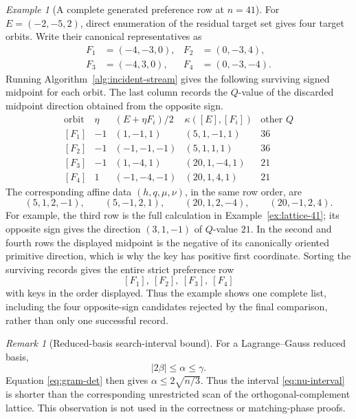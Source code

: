 \documentclass[11pt]{amsart}
\theoremstyle{definition}
\theoremstyle{remark}
\newtheorem{remark}[theorem]{Remark}
\newtheorem{example}[theorem]{Example}
\begin{document}
\begin{example}[A complete generated preference row at $n=41$]
\label{ex:complete-row-41}
For $E=(-2,-5,2)$, direct enumeration of the residual target set gives four
target orbits.  Write their canonical representatives as
\[
\begin{aligned}
 F_1&=(-4,-3,0),&F_2&=(0,-3,4),\\
 F_3&=(-4,3,0), &F_4&=(0,-3,-4).
\end{aligned}
\]
Running Algorithm~\ref{alg:incident-stream} gives the following surviving
signed midpoint for each orbit.  The last column records the $Q$-value of the
discarded midpoint direction obtained from the opposite sign.
\[
\begin{array}{c|c|c|c|c}
\text{orbit}&\eta&(E+\eta F_i)/2&\kappa([E],[F_i])&\text{other }Q\\ \hline
{[F_1]}&-1&(1,-1,1)&(5,1,-1,1)&36\\
{[F_2]}&-1&(-1,-1,-1)&(5,1,1,1)&36\\
{[F_3]}&-1&(1,-4,1)&(20,1,-4,1)&21\\
{[F_4]}& 1&(-1,-4,-1)&(20,1,4,1)&21
\end{array}
\]
The corresponding affine data $(h,q,\mu,\nu)$, in the same row order, are
\[
 (5,1,2,-1),\qquad
 (5,-1,2,1),\qquad
 (20,1,2,-4),\qquad
 (20,-1,2,4).
\]
For example, the third row is the full calculation in
Example~\ref{ex:lattice-41}; its opposite sign gives the direction
$(3,1,-1)$ of $Q$-value $21$.  In the second and fourth rows the displayed
midpoint is the negative of its canonically oriented primitive direction,
which is why the key has positive first coordinate.  Sorting the surviving
records gives the entire strict preference row
\[
 [F_1],\ [F_2],\ [F_3],\ [F_4]
\]
with keys in the order displayed.  Thus the example shows one complete list,
including the four opposite-sign candidates rejected by the final comparison,
rather than only one successful record.
\end{example}

\begin{remark}[Reduced-basis search-interval bound]
\label{rem:size-reduction}
For a Lagrange--Gauss reduced basis,
\[
 |2\beta|\le\alpha\le\gamma.
\]
Equation \eqref{eq:gram-det} then gives
$\alpha\le2\sqrt{n/3}$.  Thus the interval \eqref{eq:nu-interval} is shorter
than the corresponding unrestricted scan of the orthogonal-complement
lattice.  This observation is not used in the correctness or matching-phase
proofs.
\end{remark}
\end{document}
